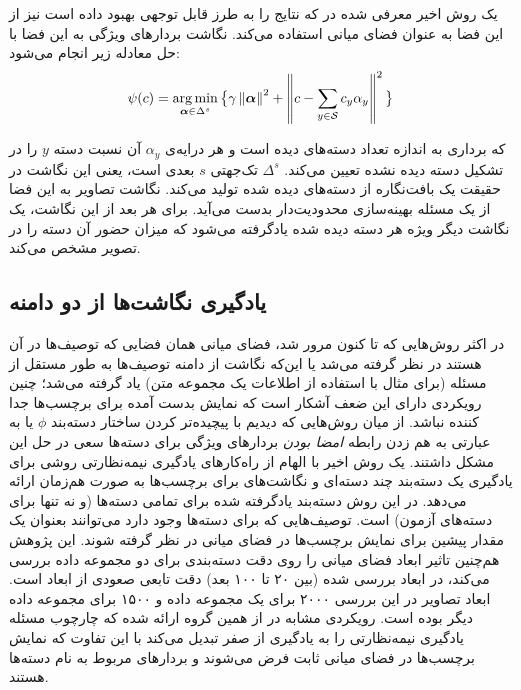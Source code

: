 یک روش اخیر معرفی شده در \cite{ sse} که نتایج را به طرز قابل توجهی بهبود داده است نیز از این فضا به عنوان فضای میانی استفاده می‌کند. نگاشت بردارهای ویژگی به این فضا با حل معادله زیر انجام می‌شود:
\begin{equation} \label{sse_att}
\psi(c) = \operatorname*{arg\,min}_{ \boldsymbol{\alpha} \in \Delta^{s} } \big \{ \gamma \left \lVert \boldsymbol{\alpha} \right \rVert^2 + \left \lVert c - \sum_{y \in \mathcal{S}} c_y \alpha_y \right \rVert^2 \big \}
\end{equation}

که 
\boldmath{$\alpha$}
برداری به اندازه تعداد دسته‌های دیده است و هر درایه‌ی $\alpha_y$ آن نسبت دسته $y$ را در تشکیل دسته دیده نشده تعیین می‌کند. $\Delta^{s}$ تک‌جهتی 
 $s$
 بعدی  است، یعنی این نگاشت در حقیقت یک بافت‌نگاره 
از دسته‌های دیده شده تولید می‌کند. نگاشت تصاویر به این فضا از یک مسئله بهینه‌سازی محدودیت‌دار بدست می‌آید. برای هر بعد از این نگاشت، یک نگاشت دیگر ویژه هر دسته دیده شده یادگرفته می‌شود که میزان حضور آن دسته را در تصویر مشخص می‌کند.
\subsection{یادگیری نگاشت‌ها از دو دامنه}\label{joint_embedding}
در اکثر روش‌هایی که تا کنون مرور شد، فضای میانی همان فضایی که توصیف‌ها در آن هستند در نظر گرفته می‌شد یا این‌که نگاشت از دامنه توصیف‌ها به طور مستقل از مسئله (برای مثال با استفاده از اطلاعات یک مجموعه متن) یاد گرفته می‌شد؛ چنین رویکردی دارای این ضعف آشکار است که نمایش بدست آمده برای برچسب‌ها جدا کننده‌
 نباشد. از میان روش‌هایی که دیدیم  \cite{ajoint11, unified13} با پیچیده‌تر کردن ساختار دسته‌بند $\phi$ یا به عبارتی به هم زدن رابطه \emph{ امضا بودن} بردارهای ویژگی برای دسته‌ها سعی در حل این مشکل داشتند. یک روش اخیر \cite{ semi15} با الهام از راه‌کارهای یادگیری نیمه‌نظارتی روشی برای یادگیری  یک دسته‌بند چند دسته‌ای و نگاشت‌های برای برچسب‌ها به صورت هم‌زمان ارائه می‌دهد. در این روش دسته‌بند یادگرفته شده برای تمامی دسته‌ها (و نه تنها برای دسته‌های آزمون) است. توصیف‌هایی که برای دسته‌ها وجود دارد می‌توانند بعنوان یک مقدار پیشین  برای نمایش برچسب‌ها در فضای میانی در نظر گرفته شوند. این پژوهش هم‌چنین تاثیر ابعاد فضای میانی را روی دقت دسته‌بندی برای دو مجموعه داده بررسی می‌کند، در ابعاد بررسی شده (بین ۲۰ تا ۱۰۰ بعد) دقت تابعی صعودی از ابعاد است. ابعاد تصاویر در این بررسی ۲۰۰۰ برای یک مجموعه داده و ۱۵۰۰ برای مجموعه داده دیگر بوده است.
رویکردی مشابه در \cite{ li15max} از همین گروه ارائه شده که چارچوب مسئله یادگیری نیمه‌نظارتی را به یادگیری از صفر تبدیل می‌کند با این تفاوت که نمایش برچسب‌ها در فضای میانی ثابت فرض می‌شوند و بردارهای مربوط به نام دسته‌ها هستند. 


